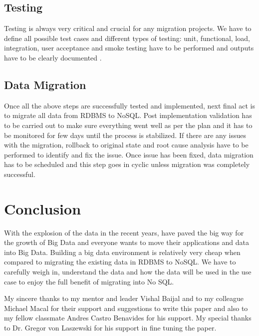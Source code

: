 \documentclass[sigconf]{acmart}
\begin{document}
\subsection{Testing} 

Testing is always very critical and crucial for any migration projects. We have to define all possible test cases and different types of testing: unit, functional, load, integration, user acceptance and smoke testing have to be performed and outputs have to be clearly documented \cite{aws}.

\subsection{Data Migration} 

Once all the above steps are successfully tested and implemented, next final act is to migrate all data from RDBMS to NoSQL. Post implementation validation has to be carried out to make sure everything went well as per the plan and it has to be monitored for few days until the process is stabilized. If there are any issues with the migration, rollback to original state and root cause analysis have to be performed to identify and fix the issue. Once issue has been fixed, data migration has to be scheduled and this step goes in cyclic unless migration was completely successful. 

\section{Conclusion}

With the explosion of the data in the recent years, have paved the big way for the growth of Big Data and everyone wants to move their applications and data into Big Data. Building a big data environment is relatively very cheap when compared to migrating the existing data in RDBMS to NoSQL. We have to carefully weigh in, understand the data and how the data will be used in the use case to enjoy the full benefit of migrating into No SQL.

\begin{acks}

My sincere thanks to my mentor and leader Vishal Baijal and to my colleague Michael Macal for their support and suggestions to write this paper and also to my fellow classmate Andres Castro Benavides for his support. My special thanks to Dr. Gregor von Laszewski for his support in fine tuning the paper.

\end{acks}


 
\end{document}
